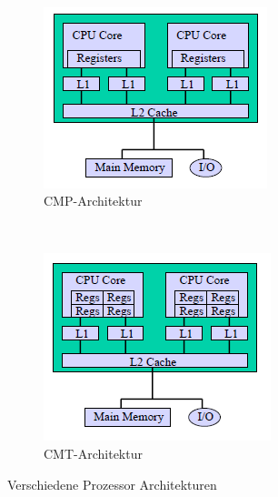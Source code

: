 \begin{figure}
	~
	\begin{subfigure}[b]{0.25\textwidth}
		\includegraphics[width=\textwidth]{fig/mc_shared_cache}
		\caption{CMP-Architektur}
		\label{fig:mc_shared_cache_chip}
	\end{subfigure}
	~
	\begin{subfigure}[b]{0.25\textwidth}
		\includegraphics[width=\textwidth]{fig/mc_shared_cache_mt}
		\caption{CMT-Architektur}
		\label{fig:mc_shared_cache:mt}
	\end{subfigure}
	\caption{Verschiedene Prozessor Architekturen}
	\label{fig:cache_strukturen}
\end{figure}

